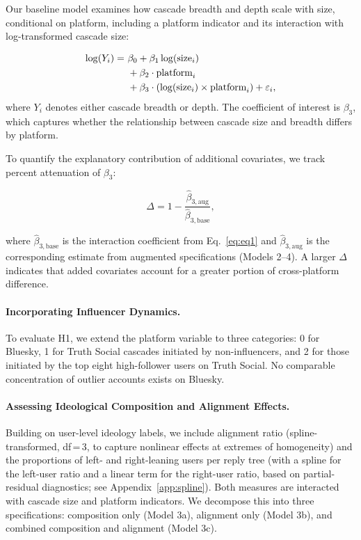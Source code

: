 \documentclass[letterpaper]{article} %
\begin{document}
Our baseline model examines how cascade breadth and depth scale with size, conditional on platform, including a platform indicator and its interaction with log-transformed cascade size:

\begin{align}
\label{eq:eq1}
\log(Y_i) =\ & \beta_0 + \beta_1 \log(\text{size}_i) \notag \\
             & + \beta_2 \cdot \text{platform}_i \notag \\
             & + \beta_3 \cdot \left( \log(\text{size}_i) \times \text{platform}_i \right) + \varepsilon_i ,
\end{align}
where $Y_i$ denotes either cascade breadth or depth. The coefficient of interest is $\beta_3$, which captures whether the relationship between cascade size and breadth differs by platform.

To quantify the explanatory contribution of additional covariates, we track percent attenuation of $\beta_3$:

\begin{equation}
\Delta = 1 - \frac{\hat{\beta}_{3,\text{aug}}}{\hat{\beta}_{3,\text{base}}} ,
\end{equation}

where $\hat{\beta}_{3,\text{base}}$ is the interaction coefficient from Eq.~\ref{eq:eq1} and $\hat{\beta}_{3,\text{aug}}$ is the corresponding estimate from augmented specifications (Models 2--4). A larger $\Delta$ indicates that added covariates account for a greater portion of cross-platform difference.

\paragraph*{Incorporating Influencer Dynamics.}
To evaluate H1, we extend the platform variable to three categories: 0 for Bluesky, 1 for Truth Social cascades initiated by non-influencers, and 2 for those initiated by the top eight high-follower users on Truth Social. No comparable concentration of outlier accounts exists on Bluesky.

\paragraph*{Assessing Ideological Composition and Alignment Effects.}
Building on user-level ideology labels, we include alignment ratio (spline-transformed, df\,=\,3, to capture nonlinear effects at extremes of homogeneity) and the proportions of left- and right-leaning users per reply tree (with a spline for the left-user ratio and a linear term for the right-user ratio, based on partial-residual diagnostics; see Appendix~\ref{app:spline}). Both measures are interacted with cascade size and platform indicators. We decompose this into three specifications: composition only (Model 3a), alignment only (Model 3b), and combined composition and alignment (Model 3c). 
\end{document}
